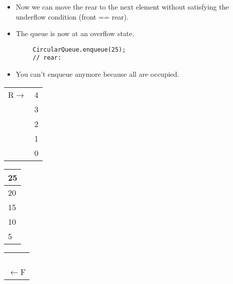 \begin{center}
    \begin{itemize}
        \item Now we can move the rear to the next element without satisfying the underflow condition (front == rear).
        \item The queue is now at an overflow state.
    \end{itemize}
    \begin{verbatim}
        CircularQueue.enqueue(25);
        // rear: 
    \end{verbatim}
    \begin{itemize}
        \item You can't enqueue anymore because all are occupied. 
    \end{itemize}
    \begin{tabular}{ cc }
        {R$\rightarrow$}&{4} \\ {}&{3} \\ {}&{2} \\ {}&{1} \\ {}&{0} \\
    \end{tabular}
    \begin{tabular}{|p{0.75cm}|}
        \hline {25} \\ \hline {20} \\ \hline {15} \\ \hline {10} \\ \hline {5} \\ \hline
    \end{tabular}
    \begin{tabular}{ c }
        {} \\ {} \\ {} \\ {} \\ {$\leftarrow$F} \\
    \end{tabular}
\end{center}

